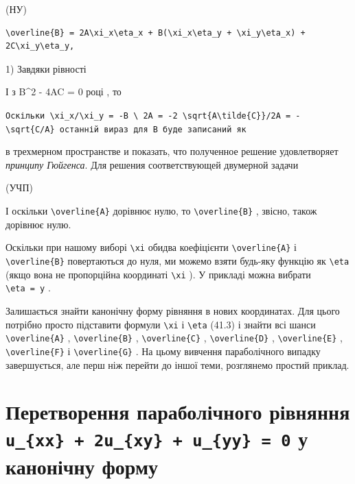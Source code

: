 \documentclass[
  ukrainian,
]{article}
\begin{document}
(НУ)

\begin{verbatim}
\overline{B} = 2A\xi_x\eta_x + B(\xi_x\eta_y + \xi_y\eta_x) + 2C\xi_y\eta_y,
\end{verbatim}

1) Завдяки рівності

І з B\^{}2 - 4AC = 0 році , то

\texttt{Оскільки\ \textquotesingle{}\textbackslash{}xi\_x/\textbackslash{}xi\_y\ =\ -B\ \textbackslash{}\ 2A\ =\ -2\ \textbackslash{}sqrt\{A\textbackslash{}tilde\{C\}\}/2A\ =\ -\textbackslash{}sqrt\{C/A\}\textquotesingle{}\ останній\ вираз\ для\ B\ буде\ записаний\ як}

в трехмерном пространстве и показать, что полученное решение
удовлетворяет \emph{принципу Гюйгенса}. Для решения соответствующей
двумерной задачи

(УЧП)

І оскільки \texttt{\textbackslash{}overline\{A\}} дорівнює нулю, то
\texttt{\textbackslash{}overline\{B\}} , звісно, також дорівнює нулю.

Оскільки при нашому виборі \texttt{\textbackslash{}xi} обидва
коефіцієнти \texttt{\textbackslash{}overline\{A\}} і
\texttt{\textbackslash{}overline\{B\}} повертаються до нуля, ми можемо
взяти будь-яку функцію як \texttt{\textbackslash{}eta} (якщо вона не
пропорційна координаті \texttt{\textbackslash{}xi} ). У прикладі можна
вибрати \texttt{\textbackslash{}eta\ =\ y} .

Залишається знайти канонічну форму рівняння в нових координатах. Для
цього потрібно просто підставити формули \texttt{\textbackslash{}xi} і
\texttt{\textbackslash{}eta} (41.3) і знайти всі шанси
\texttt{\textbackslash{}overline\{A\}} ,
\texttt{\textbackslash{}overline\{B\}} ,
\texttt{\textbackslash{}overline\{C\}} ,
\texttt{\textbackslash{}overline\{D\}} ,
\texttt{\textbackslash{}overline\{E\}} ,
\texttt{\textbackslash{}overline\{F\}} і
\texttt{\textbackslash{}overline\{G\}} . На цьому вивчення параболічного
випадку завершується, але перш ніж перейти до іншої теми, розглянемо
простий приклад.

\section{\texorpdfstring{Перетворення параболічного рівняння
\texttt{u\_\{xx\}\ +\ 2u\_\{xy\}\ +\ u\_\{yy\}\ =\ 0} у канонічну
форму}{Перетворення параболічного рівняння u\_\{xx\} + 2u\_\{xy\} + u\_\{yy\} = 0 у канонічну форму}}\label{ux43fux435ux440ux435ux442ux432ux43eux440ux435ux43dux43dux44f-ux43fux430ux440ux430ux431ux43eux43bux456ux447ux43dux43eux433ux43e-ux440ux456ux432ux43dux44fux43dux43dux44f-u_xx-2u_xy-u_yy-0-ux443-ux43aux430ux43dux43eux43dux456ux447ux43dux443-ux444ux43eux440ux43cux443}
\end{document}
